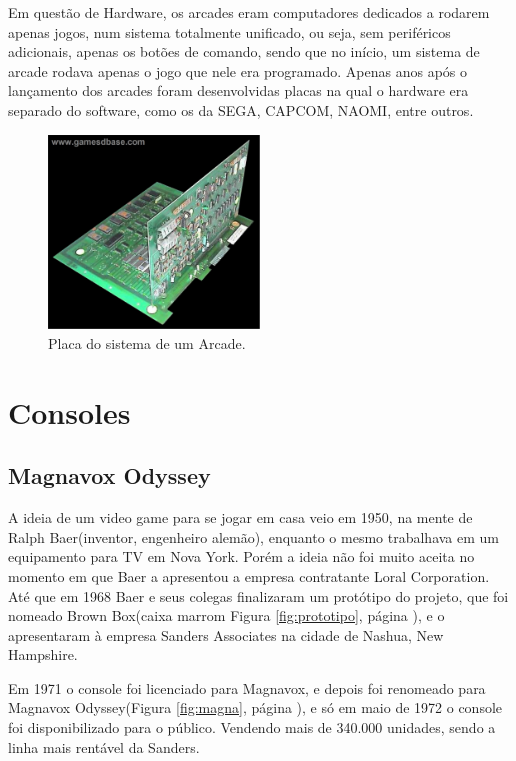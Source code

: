 \documentclass[12pt]{article}
\begin{document}
Em quest\~{a}o de Hardware, os arcades eram computadores dedicados a rodarem apenas jogos, num sistema totalmente unificado, ou seja, sem periféricos adicionais, apenas os bot\~{o}es de comando, sendo que no início, um sistema de arcade rodava apenas o jogo que nele era programado. Apenas anos após o lançamento dos arcades foram desenvolvidas placas na qual o hardware era separado do software, como os da SEGA, CAPCOM, NAOMI, entre outros.
\begin{figure}[!ht]
    \centering
    \includegraphics[width=0.5\textwidth]{placaarcade.jpg}
    \caption{Placa do sistema de um Arcade.}
    \label{fig:placaarcade}
\end{figure}

\section{Consoles}
\subsection{Magnavox Odyssey}

A ideia de um video game para se jogar em casa veio em 1950, na mente de Ralph Baer(inventor, engenheiro alem\~{a}o), enquanto o mesmo trabalhava em um equipamento para TV em Nova York. Porém a ideia n\~{a}o foi muito aceita no momento em que Baer a apresentou a empresa contratante Loral Corporation. Até que em 1968 Baer e seus colegas finalizaram um protótipo do projeto, que foi nomeado Brown Box(caixa marrom Figura \ref{fig:prototipo}, página \pageref{fig:prototipo}), e o apresentaram à empresa Sanders Associates na cidade de Nashua, New Hampshire.

Em 1971 o console foi licenciado para Magnavox, e depois foi renomeado para Magnavox Odyssey(Figura \ref{fig:magna}, página \pageref{fig:magna}), e só em maio de 1972 o console foi disponibilizado para o público. Vendendo mais de 340.000 unidades, sendo a linha mais rentável da Sanders.
\end{document}
